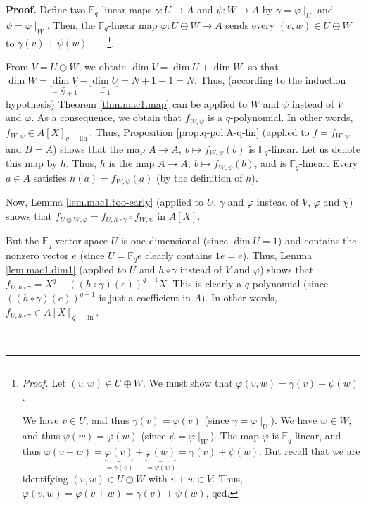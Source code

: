 \documentclass[numbers=enddot,12pt,final,onecolumn,notitlepage]{scrartcl}%
\theoremstyle{definition}
\newenvironment{proof}[1][Proof]{\noindent\textbf{#1.} }{\ \rule{0.5em}{0.5em}}
\begin{document}
\begin{proof}
Define two $\mathbb{F}_{q}$-linear maps $\gamma:U\rightarrow A$ and
$\psi:W\rightarrow A$ by $\gamma=\varphi\mid_{U}$ and $\psi=\varphi\mid_{W}$.
Then, the $\mathbb{F}_{q}$-linear map $\varphi:U\oplus W\rightarrow A$ sends
every $\left(  v,w\right)  \in U\oplus W$ to $\gamma\left(  v\right)
+\psi\left(  w\right)  $\ \ \ \ \footnote{\textit{Proof.} Let $\left(
v,w\right)  \in U\oplus W$. We must show that $\varphi\left(  v,w\right)
=\gamma\left(  v\right)  +\psi\left(  w\right)  $.
\par
We have $v\in U$, and thus $\gamma\left(  v\right)  =\varphi\left(  v\right)
$ (since $\gamma=\varphi\mid_{U}$). We have $w\in W$, and thus $\psi\left(
w\right)  =\varphi\left(  w\right)  $ (since $\psi=\varphi\mid_{W}$). The map
$\varphi$ is $\mathbb{F}_{q}$-linear, and thus $\varphi\left(  v+w\right)
=\underbrace{\varphi\left(  v\right)  }_{=\gamma\left(  v\right)
}+\underbrace{\varphi\left(  w\right)  }_{=\psi\left(  w\right)  }%
=\gamma\left(  v\right)  +\psi\left(  w\right)  $. But recall that we are
identifying $\left(  v,w\right)  \in U\oplus W$ with $v+w\in V$. Thus,
$\varphi\left(  v,w\right)  =\varphi\left(  v+w\right)  =\gamma\left(
v\right)  +\psi\left(  w\right)  $, qed.}.

From $V=U\oplus W$, we obtain $\dim V=\dim U+\dim W$, so that $\dim
W=\underbrace{\dim V}_{=N+1}-\underbrace{\dim U}_{=1}=N+1-1=N$. Thus,
(according to the induction hypothesis) Theorem \ref{thm.mac1.map} can be
applied to $W$ and $\psi$ instead of $V$ and $\varphi$. As a consequence, we
obtain that $f_{W,\psi}$ is a $q$-polynomial. In other words, $f_{W,\psi}\in
A\left[  X\right]  _{q-\operatorname*{lin}}$. Thus, Proposition
\ref{prop.q-pol.A-q-lin} (applied to $f=f_{W,\psi}$ and $B=A$) shows that the
map $A\rightarrow A,\ b\mapsto f_{W,\psi}\left(  b\right)  $ is $\mathbb{F}%
_{q}$-linear. Let us denote this map by $h$. Thus, $h$ is the map
$A\rightarrow A,\ b\mapsto f_{W,\psi}\left(  b\right)  $, and is
$\mathbb{F}_{q}$-linear. Every $a\in A$ satisfies $h\left(  a\right)
=f_{W,\psi}\left(  a\right)  $ (by the definition of $h$).

Now, Lemma \ref{lem.mac1.too-early} (applied to $U$, $\gamma$ and $\varphi$
instead of $V$, $\varphi$ and $\chi$) shows that $f_{U\oplus W,\varphi
}=f_{U,h\circ\gamma}\circ f_{W,\psi}$ in $A\left[  X\right]  $.

But the $\mathbb{F}_{q}$-vector space $U$ is one-dimensional (since $\dim
U=1$) and contains the nonzero vector $e$ (since $U=\mathbb{F}_{q}e$ clearly
contains $1e=e$). Thus, Lemma \ref{lem.mac1.dim1} (applied to $U$ and
$h\circ\gamma$ instead of $V$ and $\varphi$) shows that $f_{U,h\circ\gamma
}=X^{q}-\left(  \left(  h\circ\gamma\right)  \left(  e\right)  \right)
^{q-1}X$. This is clearly a $q$-polynomial (since $\left(  \left(
h\circ\gamma\right)  \left(  e\right)  \right)  ^{q-1}$ is just a coefficient
in $A$). In other words, $f_{U,h\circ\gamma}\in A\left[  X\right]
_{q-\operatorname*{lin}}$.


\end{proof}
\end{document}
